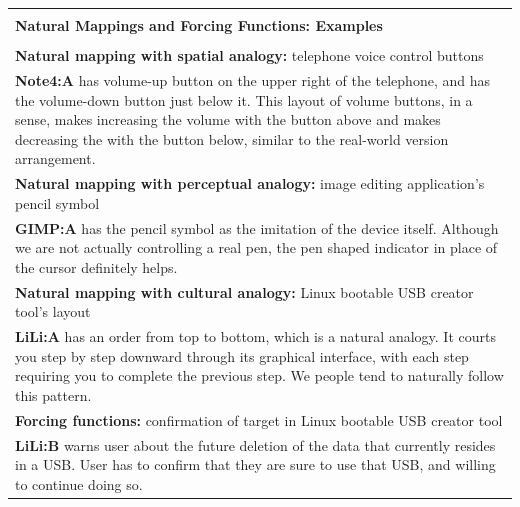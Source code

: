 \documentclass[a4paper,11pt,oneside]{scrreprt}
\begin{document}
\begin{table}[h]
	\begin{tabularx}{\textwidth}{|X|}
		
		\hline
			\\
			\textbf{Natural Mappings and Forcing Functions: Examples} \\
			\\
		\hline
		
			\textbf{Natural mapping with spatial analogy:} telephone voice control buttons			\\
			\textbf{Note4:A} has volume-up button on the upper right of the telephone, and has the volume-down button just below it. This layout of volume buttons, in a sense, makes increasing the volume with the button above and makes decreasing the with the button below, similar to the real-world version arrangement. \\
			
		\hline
				
			\textbf{Natural mapping with perceptual analogy:} image editing application's pencil symbol\\
			\textbf{GIMP:A}	has the pencil symbol as the imitation of the device itself. Although we are not actually controlling a real pen, the pen shaped indicator in place of the cursor definitely helps. \\
			
		\hline
		
			\textbf{Natural mapping with cultural analogy:}	Linux bootable USB creator tool's layout		\\
			\textbf{LiLi:A} has an order from top to bottom, which is a natural analogy. It courts you step by step downward through its graphical interface, with each step requiring you to complete the previous step. We people tend to naturally follow this pattern.\\
			
		\hline
		
			\textbf{Forcing functions:} confirmation of target in Linux bootable USB creator tool			\\
			\textbf{LiLi:B} warns user about the future deletion of the data that currently resides in a USB. User has to confirm that they are sure to use that USB, and willing to continue doing so.\\
			
			\hline
		
		\hline
	\end{tabularx}
\end{table}
\end{document}
